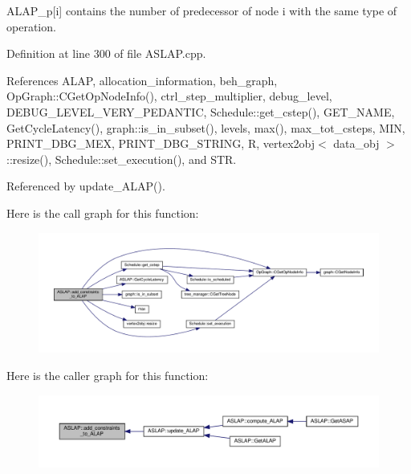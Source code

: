 A\+L\+A\+P\+\_\+p\mbox{[}i\mbox{]} contains the number of predecessor of node i with the same type of operation. 

Definition at line 300 of file A\+S\+L\+A\+P.\+cpp.



References A\+L\+AP, allocation\+\_\+information, beh\+\_\+graph, Op\+Graph\+::\+C\+Get\+Op\+Node\+Info(), ctrl\+\_\+step\+\_\+multiplier, debug\+\_\+level, D\+E\+B\+U\+G\+\_\+\+L\+E\+V\+E\+L\+\_\+\+V\+E\+R\+Y\+\_\+\+P\+E\+D\+A\+N\+T\+IC, Schedule\+::get\+\_\+cstep(), G\+E\+T\+\_\+\+N\+A\+ME, Get\+Cycle\+Latency(), graph\+::is\+\_\+in\+\_\+subset(), levels, max(), max\+\_\+tot\+\_\+csteps, M\+IN, P\+R\+I\+N\+T\+\_\+\+D\+B\+G\+\_\+\+M\+EX, P\+R\+I\+N\+T\+\_\+\+D\+B\+G\+\_\+\+S\+T\+R\+I\+NG, R, vertex2obj$<$ data\+\_\+obj $>$\+::resize(), Schedule\+::set\+\_\+execution(), and S\+TR.



Referenced by update\+\_\+\+A\+L\+A\+P().

Here is the call graph for this function\+:
\nopagebreak
\begin{figure}[H]
\begin{center}
\leavevmode
\includegraphics[width=350pt]{d9/d2a/classASLAP_a3ab73e853dc4b3286cc1e4d76e6e313d_cgraph}
\end{center}
\end{figure}
Here is the caller graph for this function\+:
\nopagebreak
\begin{figure}[H]
\begin{center}
\leavevmode
\includegraphics[width=350pt]{d9/d2a/classASLAP_a3ab73e853dc4b3286cc1e4d76e6e313d_icgraph}
\end{center}
\end{figure}
\mbox{\label{classASLAP_a1329f2184152a6e5d403a3d82c2a0ca0}} 
